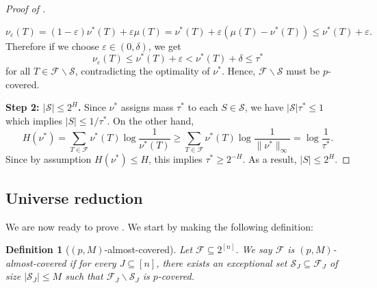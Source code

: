 \documentclass{article}
\newtheorem{definition}[definition]{Definition}
\renewcommand{\epsilon}{\varepsilon}
\newcommand{\<}{\langle}
\renewcommand{\>}{\rangle}
\newcommand{\calF}{\mathcal{F}}
\newcommand{\calS}{\mathcal{S}}
\begin{document}
\begin{proof}[Proof of  ]
\begin{itemize}
        \[
        \nu_{\epsilon}(T) = (1-\epsilon)\nu^* (T) + \epsilon \mu (T) = \nu^* (T) + \epsilon (\mu (T) - \nu^*(T)) \leq \nu^* (T) + \epsilon.
        \]
        Therefore if we choose $\epsilon \in (0, \delta)$, we get  
        \[
        \nu_{\epsilon}(T) \leq \nu^* (T) + \epsilon <\nu^* (T) + \delta  \leq \tau^*
        \]
        for all $T \in \calF \backslash \calS$, contradicting the optimality of $\nu^*$. Hence, $\calF \backslash \calS$ must be $p$-covered.
    \end{itemize}
    \noindent \textbf{Step 2: $|\calS| \leq 2^H$.} Since $\nu^*$ assigns mass $\tau^*$ to each $S \in \calS$, we have $|\calS| \tau^* \leq 1$ which implies $|S| \leq 1 / \tau^*$. On the other hand, 
    \[
    H(\nu^*) = \sum_{T \in \calF} \nu^* (T) \log \frac{1}{\nu^* (T)} \geq  \sum_{T \in \calF} \nu^* (T) \log \frac{1}{\|\nu^* \|_{\infty}} = \log \frac{1}{\tau^*}.
    \]
    Since by assumption $H(\nu^*) \leq H$, this implies $\tau^* \geq 2^{-H}$. As a result, $|S| \leq 2^H$. 
    
\end{proof}

\subsection{Universe reduction}\label{subsec:universe_reduction}
We are now ready to prove .  We start by making the following definition:


\begin{definition}[$(p, M)$-almost-covered]\label{definition:goodness} Let $\calF \subseteq 2^{[n]}$. We say $\calF$ is \emph{$(p, M)$-almost-covered} if for every $J \subseteq [n]$, there exists an exceptional set $\calS_J \subseteq \calF_J$ of size $|\calS_J| \leq M$ such that $\calF_J \backslash \calS_J$ is $p$-covered.

\end{definition}
\end{document}
